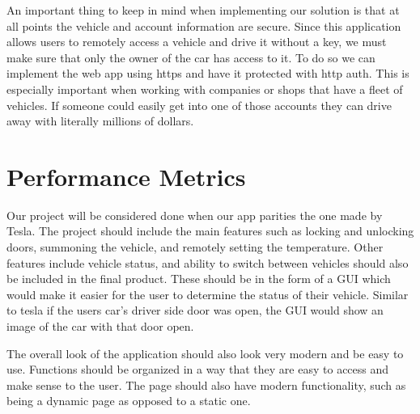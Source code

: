 \documentclass[draftclsnofoot, onecolumn, compsoc, 10pt]{IEEEtran}
\begin{document}
An important thing to keep in mind when implementing our solution is that at all points the vehicle and account information are secure. Since this application allows users to remotely access a vehicle and drive it without a key, we must make sure that only the owner of the car has access to it. To do so we can implement the web app using https and have it protected with http auth. This is especially important when working with companies or shops that have a fleet of vehicles. If someone could easily get into one of those accounts they can drive away with literally millions of dollars.
 

\section{Performance Metrics}

Our project will be considered done when our app parities the one made by Tesla. The project should include the main features such as locking and unlocking doors, summoning the vehicle, and remotely setting the temperature. Other features include vehicle status, and ability to switch between vehicles should also be included in the final product. These should be in the form of a GUI which would make it easier for the user to determine the status of their vehicle. Similar to tesla if the users car’s driver side door was open, the GUI would show an image of the car with that door open. 

The overall look of the application should also look very modern and be easy to use. Functions should be organized in a way that they are easy to access and make sense to the user. The page should also have modern functionality, such as being a dynamic page as opposed to a static one. 

	

 
		
		

\newpage


\end{document}
